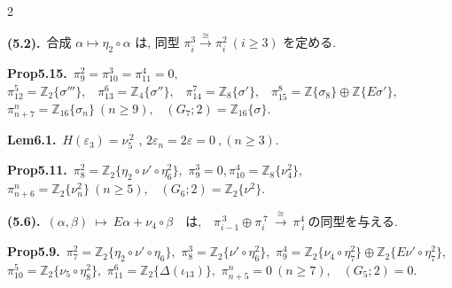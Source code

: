 \documentclass[10pt, leqno]{ltjsarticle}
\newcommand{\gen}[1]{\{#1\}}       %
\numberwithin{equation}{section}
\theoremstyle{plain}
\theoremstyle{definition}
\theoremstyle{remark}
\begin{document}
\begin{paracol}{2}
\switchcolumn

\noindent
\textbf{(5.2).}\
\(\text{合成 } \alpha\longmapsto \eta_2\circ \alpha \text{ は, 同型 } 
\pi^{3}_{i}\xrightarrow{\cong}\pi^{2}_{i}\ (i\ge3) 
\text{ を定める. }\)

\noindent
\textbf{Prop5.15.}\
\(\pi_9^2=\pi_{10}^3=\pi_{11}^4=0,\) \\
\(\pi^{5}_{12}=\mathbb Z_2\gen{\sigma'''},\) \
\(\pi^{6}_{13}=\mathbb Z_4\gen{\sigma''},\) \
\(\pi^{7}_{14}=\mathbb Z_8\gen{\sigma'},\) \
\(\pi^{8}_{15}=\mathbb Z\gen{\sigma_8}\oplus\mathbb Z\gen{E\sigma'},\) \\
\(\pi^{n}_{n+7}=\mathbb Z_{16}\gen{\sigma_n}\ (n\ge9),\) \
\((G_{7};2)=\mathbb Z_{16}\gen{\sigma}.\)

\noindent
\textbf{Lem6.1.}\
\(H(\varepsilon_3)=\nu_5^{\,2}\) , 
\(2\varepsilon_n=2\varepsilon=0\ ,(n\ge3)\). 

\noindent
\textbf{Prop5.11.}\
\(\pi^{2}_{8}=\mathbb Z_2\gen{\eta_{2}\circ\nu'\circ\eta_6^2},\)\quad 
\(\pi^{3}_{9}=0,\)\quad \(\pi^{4}_{10}=\mathbb Z_8\gen{\nu_{4}^2},\) \\
\(\pi^{n}_{n+6}=\mathbb Z_2\gen{\nu_n^2}\ (n\ge5),\) \
\((G_{6};2)=\mathbb Z_2\gen{\nu^2}.\)

\noindent
\textbf{(5.6).}\
\((\alpha,\beta)\ \longmapsto\ E\alpha+\nu_{4}\circ\beta
\quad\text{は,}\quad
\pi^{\,3}_{i-1}\oplus \pi^{\,7}_{i}\ \xrightarrow{\ \cong\ }\ \pi_{\,i}^{4}
\ \text{の同型を与える. }\)

\noindent
\textbf{Prop5.9.}\
\(\pi^{2}_{7}=\mathbb Z_2\gen{\eta_{2}\circ\nu'\circ\eta_6},\) \quad
\(\pi^{3}_{8}=\mathbb Z_2\gen{\nu'\circ\eta_6^2},\) \quad
\(\pi^{4}_{9}=\mathbb Z_2\gen{\nu_{4}\circ\eta_7^2}\oplus \mathbb Z_2\gen{E\nu'\circ\eta_7^2},\) \\
\(\pi^{5}_{10}=\mathbb Z_2\gen{\nu_{5}\circ\eta_8^2},\) \quad
\(\pi^{6}_{11}=\mathbb Z_2\gen{\Delta(\iota_{13})},\) \quad
\(\pi^{n}_{n+5}=0\ (n\ge7),\) \
\((G_{5};2)=0.\)




\end{paracol}

\newpage
\end{document}
